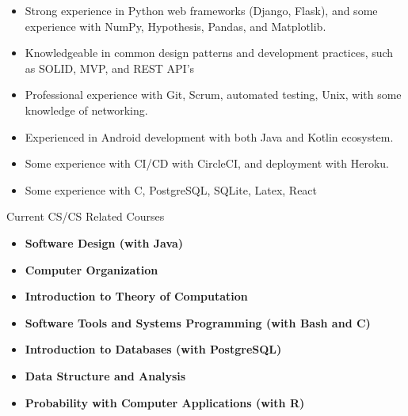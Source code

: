 \begin{itemize}
\item Strong experience in Python web frameworks (Django, Flask), and some experience with NumPy, Hypothesis, Pandas, and Matplotlib.
\item Knowledgeable in common design patterns and development practices, such as SOLID, MVP, and REST API’s
\item Professional experience with Git, Scrum, automated testing, Unix, with some knowledge of networking.
\item Experienced in Android development with both Java and Kotlin ecosystem.
\item Some experience with CI/CD with CircleCI, and deployment with Heroku.
\item Some experience with C, PostgreSQL, SQLite, Latex, React
\end{itemize}





Current CS/CS Related Courses \\[4pt]
\begin{itemize}
\item \textbf{Software Design (with Java)}
\item \textbf{Computer Organization}
\item \textbf{Introduction to Theory of Computation}
\item \textbf{Software Tools and Systems Programming (with Bash and C)}
\item \textbf{Introduction to Databases (with PostgreSQL)}
\item \textbf{Data Structure and Analysis}
\item \textbf{Probability with Computer Applications (with R)}
\end{itemize}



\divider


\divider

